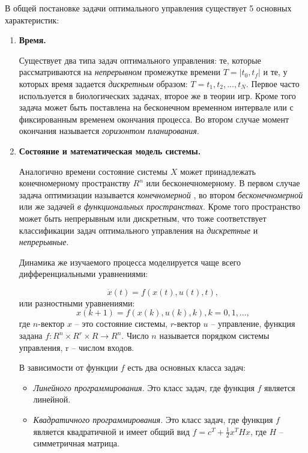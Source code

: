 В общей постановке задачи оптимального управления существует 5 основных характеристик:
\begin{enumerate}
    \item \textbf{Время.} 
    
    Существует два типа задач оптимального управления: те, которые рассматриваются на \textit{непрерывном} промежутке времени $T=|t_0, t_f|$ и те, у которых время задается \textit{дискретным} образом: $T = {t_1, t_2, ...,t_N}$. Первое часто используется в биологических задачах, второе же в теории игр. Кроме того задача может быть поставлена на бесконечном временном интервале или с фиксированным временем окончания процесса. Во втором случае момент окончания называется \textit{горизонтом планирования}.
    
    \item \textbf{Состояние и математическая модель системы.} 
    
    Аналогично времени состояние системы $X$ может принадлежать конечномерному пространству $R^n$ или бесконечномерному. В первом случае задача оптимизации называется {\it конечномерной} , во втором {\it бесконечномерной} или же  задачей {\it в функциональных пространствах}. Кроме того пространство может быть непрерывным или дискретным, что тоже соответствует классификации задач оптимального управления на {\it дискретные} и {\it непрерывные}. 
    
    Динамика же изучаемого процесса моделируется чаще всего дифференциальными уравнениями: 
    
    \begin{equation} \label{eq:diff}
    \dot{x}(t)=f(x(t),u(t),t),
    \end{equation}
    или разностными уравнениями: 
    \begin{equation} \label{eq:razn}
    {x(k+1)}=f(x(k),u(k),k), k=0,1,...,
    \end{equation}
    где $n$-вектор $x$ -- это состояние системы, $r$-вектор $u$ -- управление, функция задана $f: R^n \times R^r \times R \rightarrow R^n$. Число $n$ называется порядком системы управления, r -- числом входов. 
    
    В зависимости от функции $f$ есть два основных класса задач:
    \begin{itemize}
    	\item  {\it Линейного программирования.} Это класс задач, где функция $f$ является линейной. 
    	\item {\it Квадратичного программирования.} Это класс задач, где  функция $f$ является квадратичной и имеет общий вид $f = c^T + \frac{1}{2} x^T H x$, где $H$ -- симметричная матрица.
    \end{itemize}
    

\end{enumerate}
